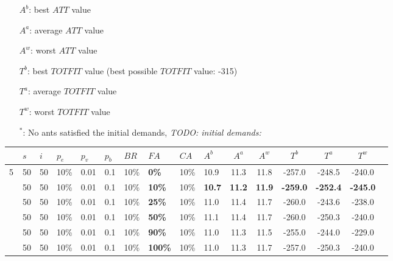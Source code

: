 \begin{sidewaystable}
\begin{itemize}[noitemsep]
    \item[$A^b$:] best $ATT$ value
    \item[$A^a$:] average $ATT$ value
    \item[$A^w$:] worst $ATT$ value
    \item[$T^b$:] best $TOTFIT$ value (best possible $TOTFIT$ value: -315)
    \item[$T^a$:] average $TOTFIT$ value
    \item[$T^w$:] worst $TOTFIT$ value
    \item[$^*$:] No ants satisfied the initial demands, \emph{\color{blue} TODO: initial demands: }
    \end{itemize}
    \label{table:pm1}
\end{sidewaystable}

\begin{sidewaystable}
    \centering
    \begin{tabular}{|l|l|l|l|l|l|l|l|l|l||c|c|c|c|c|c|}
    \hline
    ~ & $s$ & $i$ & $p_{e}$ & $p_{v}$ & $p_{b}$ & $BR$ & $FA$ & $CA$ & $A^b$ & $A^a$ & $A^w$ & $T^b$ & $T^a$ & $T^w$\\
    \hline
 
    5 & 50 & 50 & 10\% & 0.01 & 0.1 & 10\% & \textbf{0\%} & 10\% & 10.9 & 11.3 & 11.8 & -257.0 & -248.5 & -240.0 \\
    ~ & 50 & 50 & 10\% & 0.01 & 0.1 & 10\% & \textbf{10\%} & 10\% & \textbf{10.7} & \textbf{11.2} & \textbf{11.9} & \textbf{-259.0} & \textbf{-252.4} & \textbf{-245.0} \\
    ~ & 50 & 50 & 10\% & 0.01 & 0.1 & 10\% & \textbf{25\%} & 10\% & 11.0 & 11.4 & 11.7 & -260.0 & -243.6 & -238.0 \\
    ~ & 50 & 50 & 10\% & 0.01 & 0.1 & 10\% & \textbf{50\%} & 10\% & 11.1 & 11.4 & 11.7 & -260.0 & -250.3 & -240.0 \\
    ~ & 50 & 50 & 10\% & 0.01 & 0.1 & 10\% & \textbf{90\%} & 10\% & 11.0 & 11.3 & 11.5 & -255.0 & -244.0 & -229.0 \\
    ~ & 50 & 50 & 10\% & 0.01 & 0.1 & 10\% & \textbf{100\%} & 10\% & 11.0 & 11.3 & 11.7 & -257.0 & -250.3 & -240.0 \\


\end{tabular}
\end{sidewaystable}
